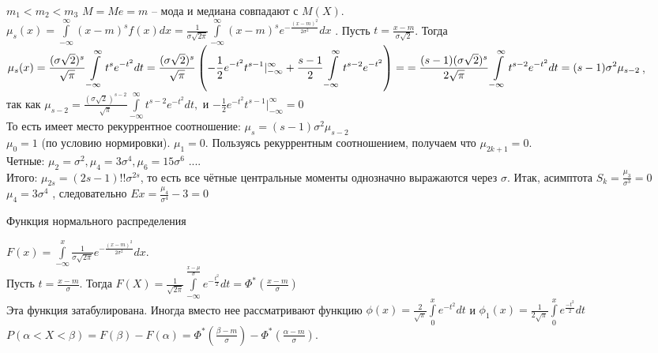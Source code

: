 \documentclass[russian, 12pt, fleqn]{article}
\begin{document}
$m_1<m_2<m_3$
$M=Me=m $ -- мода и медиана совпадают с $M(X)$.\\
$\mu_s(x) = \int\limits_{-\infty}^{\infty} (x-m)^s f(x)dx = \frac{1}{\sigma\sqrt{2\pi}} \int\limits_{-\infty}^{\infty} (x-m)^s e^{-\frac{(x-m)^2}{2\sigma^2}}dx$ . Пусть $t = \frac{x - m}{\sigma\sqrt{2}}$.
Тогда $\displaystyle{ \mu_s(x) = \frac{(\sigma \sqrt{2})^s}{\sqrt{\pi}}  \int\limits_{-\infty}^{\infty} t^s e^{-t^2} dt = \frac{(\sigma \sqrt{2})^s}{\sqrt{\pi}}\left (-\frac{1}{2}e^{-t^2}t^{s-1}|_{-\infty}^{\infty}+ \frac{s-1}{2}\int\limits_{-\infty}^{\infty}t^{s-2}e^{-t^2}\right )  } =\\ \displaystyle{ =\frac{(s-1)(\sigma\sqrt{2})^s}{2\sqrt{\pi}} \int\limits_{-\infty}^{\infty} t^{s-2}e^{-t^2}dt =(s-1)\sigma^2\mu_{s-2}}$,\\ так как $\mu_{s-2}  = \frac{(\sigma\sqrt{2})^{s-2}}{\sqrt{\pi}} \int\limits_{-\infty}^{\infty}t ^{s-2} e^{-t^2}dt,$ и $-\frac{1}{2}e^{-t^2}t^{s-1}|_{-\infty}^{\infty} = 0$\\
То есть имеет место рекуррентное соотношение: $\mu_s = (s-1)\sigma^2\mu_{s-2}$\\
$\mu_0 = 1$ (по условию нормировки). $\mu_1 = 0$. Пользуясь рекуррентным соотношением, получаем что $\mu_{2k+1} = 0$.\\
Четные: $\mu_2 = \sigma^2, \mu_4 = 3\sigma^4, \mu_6 = 15\sigma^6$ ....\\
Итого: $\mu_{2s} = (2s-1)!!\sigma^{2s}$, то есть все чётные центральные моменты однозначно выражаются через $\sigma$. Итак, асимптота $S_k = \frac{\mu_3}{\sigma^3} = 0$\\
$\mu_4 = 3\sigma^4$ , следовательно $Ex = \frac{\mu_4}{\sigma^4} - 3 = 0$
\begin{center}
$\textbf{Функция нормального распределения }$\\
\end{center}
$F(x) = \int \limits_{-\infty}^{x}\frac{1}{\sigma\sqrt{2\pi}} e^{-\frac{(x-m)^2}{2\sigma^2}}dx$.\\
Пусть $t = \frac{x-m}{\sigma}$.
Тогда $F(X) = \frac{1}{\sqrt{2\pi}}\int\limits_{-\infty}^{\frac{x-\mu}{\sigma}} e^{-\frac{t^2}{2}} dt =  \Phi^*(\frac{x-m}{\sigma})$\\
Эта функция затабулирована. Иногда вместо нее рассматривают функцию $\phi(x) = \frac{2}{\sqrt{\pi}} \int\limits_{0}^{x}e^{-t^2}dt$ и $\phi_1(x) = \frac{1}{2\sqrt{\pi}} \int\limits_{0}^{x} e^{\frac{-t^2}{2}}dt$\\
$P(\alpha < X < \beta) = F(\beta) - F(\alpha) = \Phi^*(\frac{\beta - m}{\sigma}) - \Phi^*(\frac{\alpha - m}{\sigma}).$\\
\end{document}
